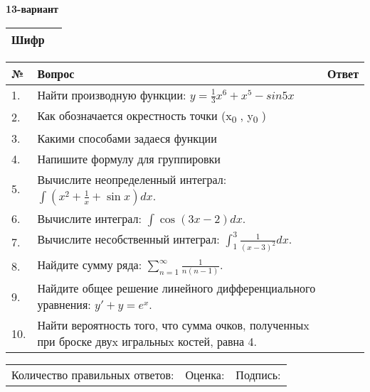 \documentclass{article}
\begin{document}
  \egroup
  
  \newpage
  
  
  \textbf{13-вариант}\\
  
  \bgroup
  \def\arraystretch{1.6} %
  
  \begin{tabular}{|m{5.7cm}|m{9.5cm}|}
  \hline
  Шифр & \\
  \hline
  \end{tabular}
  
  \vspace{1cm}
  
  \begin{tabular}{|m{0.7cm}|m{10cm}|m{4cm}|}
  \hline
  № & Вопрос & Ответ \\
  \hline
  1. & Найти производную функции: \(y = \frac{1}{3}x^{6} + x^{5} - sin5x\) &  \\
  \hline
  2. & Как обозначается окрестность точки (x\textsubscript{0} , y\textsubscript{0} ) &  \\
  \hline
  3. & Какими способами задаеся функции &  \\
  \hline
  4. & Напишите формулу для группировки &  \\
  \hline
  5. & Вычислите неопределенный интеграл: \(\int{\left( x^{2} + \frac{1}{x} + \sin x \right)dx}\). &  \\
  \hline
  6. & Вычислите интеграл: \(\int{\cos(3x - 2)dx}\). &  \\
  \hline
  7. & Вычислите несобственный интеграл: \(\int_{1}^{3}{\frac{1}{(x - 3)^{2}}dx}\). &  \\
  \hline
  8. & Найдите сумму ряда: \(\sum_{n = 1}^{\infty}\frac{1}{n(n - 1)}\). &  \\
  \hline
  9. & Найдите общее решение линейного дифференциального уравнения: \(y' + y = e^{x}\). &  \\
  \hline
  10. & Найти вероятность того, что сумма очков, полученныx при броске двуx игральныx костей, равна 4. &  \\
  \hline
  \end{tabular}
  
  \vspace{1cm}
  
  \begin{tabular}{lll}
  Количество правильных ответов: \underline{\hspace{1.5cm}} & 
  Оценка: \underline{\hspace{1.5cm}} & 
  Подпись: \underline{\hspace{2cm}} \\
  \end{tabular}
  
\end{document}
